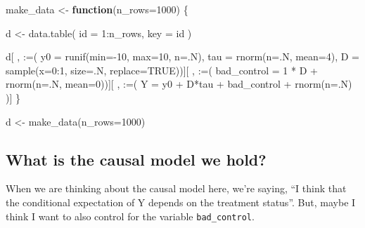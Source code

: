 \documentclass[
]{article}
\newenvironment{Shaded}{\begin{snugshade}}{\end{snugshade}}
\newcommand{\AttributeTok}[1]{\textcolor[rgb]{0.77,0.63,0.00}{#1}}
\newcommand{\ConstantTok}[1]{\textcolor[rgb]{0.00,0.00,0.00}{#1}}
\newcommand{\ControlFlowTok}[1]{\textcolor[rgb]{0.13,0.29,0.53}{\textbf{#1}}}
\newcommand{\DecValTok}[1]{\textcolor[rgb]{0.00,0.00,0.81}{#1}}
\newcommand{\FunctionTok}[1]{\textcolor[rgb]{0.00,0.00,0.00}{#1}}
\newcommand{\NormalTok}[1]{#1}
\newcommand{\OtherTok}[1]{\textcolor[rgb]{0.56,0.35,0.01}{#1}}
\newcommand{\SpecialCharTok}[1]{\textcolor[rgb]{0.00,0.00,0.00}{#1}}
\newcommand{\StringTok}[1]{\textcolor[rgb]{0.31,0.60,0.02}{#1}}
\begin{document}
\begin{Shaded}
\begin{Highlighting}[]
\NormalTok{make\_data }\OtherTok{\textless{}{-}} \ControlFlowTok{function}\NormalTok{(}\AttributeTok{n\_rows=}\DecValTok{1000}\NormalTok{) \{ }

\NormalTok{  d }\OtherTok{\textless{}{-}} \FunctionTok{data.table}\NormalTok{(}
    \AttributeTok{id =} \DecValTok{1}\SpecialCharTok{:}\NormalTok{n\_rows, }
    \AttributeTok{key =} \StringTok{\textquotesingle{}id\textquotesingle{}}
\NormalTok{    )}
  
\NormalTok{  d[ , }\StringTok{\textquotesingle{}:=\textquotesingle{}}\NormalTok{(}
    \AttributeTok{y0           =} \FunctionTok{runif}\NormalTok{(}\AttributeTok{min=}\SpecialCharTok{{-}}\DecValTok{10}\NormalTok{, }\AttributeTok{max=}\DecValTok{10}\NormalTok{, }\AttributeTok{n=}\NormalTok{.N), }
    \AttributeTok{tau          =} \FunctionTok{rnorm}\NormalTok{(}\AttributeTok{n=}\NormalTok{.N, }\AttributeTok{mean=}\DecValTok{4}\NormalTok{), }
    \AttributeTok{D            =} \FunctionTok{sample}\NormalTok{(}\AttributeTok{x=}\DecValTok{0}\SpecialCharTok{:}\DecValTok{1}\NormalTok{, }\AttributeTok{size=}\NormalTok{.N, }\AttributeTok{replace=}\ConstantTok{TRUE}\NormalTok{))][ , }\StringTok{\textquotesingle{}:=\textquotesingle{}}\NormalTok{(}
    \AttributeTok{bad\_control  =} \DecValTok{1} \SpecialCharTok{*}\NormalTok{ D }\SpecialCharTok{+} \FunctionTok{rnorm}\NormalTok{(}\AttributeTok{n=}\NormalTok{.N, }\AttributeTok{mean=}\DecValTok{0}\NormalTok{))][ , }\StringTok{\textquotesingle{}:=\textquotesingle{}}\NormalTok{(}
    \AttributeTok{Y            =}\NormalTok{ y0 }\SpecialCharTok{+}\NormalTok{ D}\SpecialCharTok{*}\NormalTok{tau }\SpecialCharTok{+}\NormalTok{ bad\_control }\SpecialCharTok{+} \FunctionTok{rnorm}\NormalTok{(}\AttributeTok{n=}\NormalTok{.N)}
\NormalTok{    )]}
\NormalTok{  \}}

\NormalTok{d }\OtherTok{\textless{}{-}} \FunctionTok{make\_data}\NormalTok{(}\AttributeTok{n\_rows=}\DecValTok{1000}\NormalTok{)}
\end{Highlighting}
\end{Shaded}

\hypertarget{what-is-the-causal-model-we-hold}{%
\subsection{What is the causal model we hold?}\label{what-is-the-causal-model-we-hold}}

When we are thinking about the causal model here, we're saying, ``I think that the conditional expectation of Y depends on the treatment status''. But, maybe I think I want to also control for the variable \texttt{bad\_control}.
\end{document}
